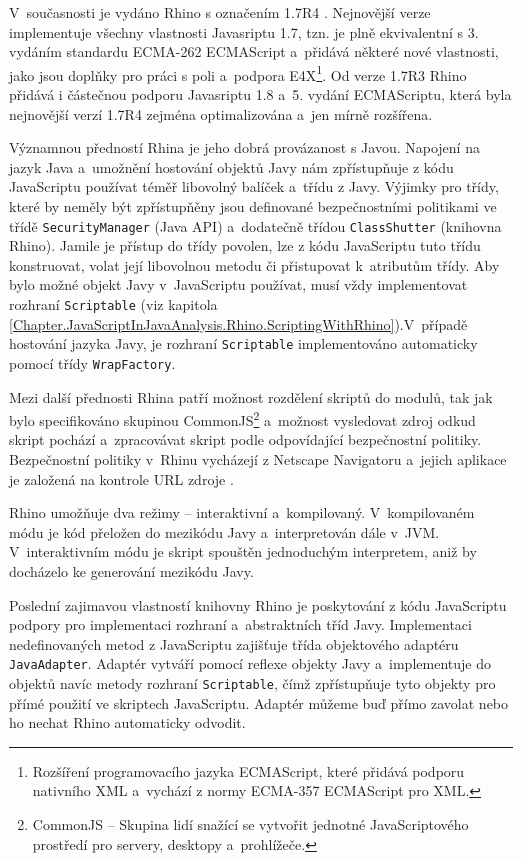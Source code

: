V~současnosti je vydáno Rhino s označením 1.7R4 \cite{Bibliography.Rhino.v17R3,Bibliography.Rhino.v17R4}. Nejnovější verze implementuje všechny vlastnosti Javasriptu 1.7, tzn. je plně ekvivalentní s 3. vydáním standardu \linebreak ECMA-262 ECMAScript a~přidává některé nové vlastnosti, jako jsou doplňky pro práci s poli a~podpora E4X\footnote{Rozšíření programovacího jazyka ECMAScript, které přidává podporu nativního XML a~vychází z normy ECMA-357 ECMAScript pro XML.}. Od verze 1.7R3 Rhino přidává i částečnou podporu Javasriptu 1.8 a~5. vydání ECMAScriptu, která byla nejnovější verzí 1.7R4 zejména optimalizována a~jen mírně rozšířena.

Významnou předností Rhina je jeho dobrá provázanost s Javou. Napojení na jazyk Java a~umožnění hostování objektů Javy nám zpřístupňuje z kódu JavaScriptu používat téměř libovolný balíček a~třídu z Javy. Výjimky pro třídy, které by neměly být zpřístupňěny jsou definované bezpečnostními politikami ve třídě \texttt{SecurityManager} (Java API) a~dodatečně třídou \texttt{ClassShutter} (knihovna Rhino). Jamile je přístup do třídy povolen, lze z kódu JavaScriptu tuto třídu konstruovat, volat její libovolnou metodu či přistupovat k~atributům třídy. Aby bylo možné objekt Javy v~JavaScriptu používat, musí vždy implementovat rozhraní \texttt{Scriptable} (viz kapitola \ref{Chapter.JavaScriptInJavaAnalysis.Rhino.ScriptingWithRhino}).V~případě hostování jazyka Javy, je rozhraní \texttt{Scriptable} implementováno automaticky pomocí třídy \texttt{WrapFactory}. 

Mezi další přednosti Rhina patří možnost rozdělení skriptů do modulů, tak jak bylo specifikováno skupinou CommonJS\footnote{CommonJS -- Skupina lidí snažící se vytvořit jednotné JavaScriptového prostředí pro servery, desktopy a~prohlížeče.} a~možnost vysledovat zdroj odkud skript pochází a~zpracovávat skript podle odpovídající bezpečnostní politiky. Bezpečnostní politiky v~Rhinu vycházejí z Netscape Navigatoru a~jejich aplikace je založená na kontrole URL zdroje \cite{Bibliography.Rhino.Overview}.

Rhino umožňuje dva režimy -- interaktivní a~kompilovaný. V~kompilovaném módu je kód přeložen do mezikódu Javy a~interpretován dále v~JVM. V~interaktivním módu je skript spouštěn jednoduchým interpretem, aniž by docházelo ke generování mezikódu Javy.

Poslední zajimavou vlastností knihovny Rhino je poskytování z kódu JavaScriptu podpory pro implementaci rozhraní a~abstraktních tříd Javy. Implementaci nedefinovaných metod z JavaScriptu zajišťuje třída objektového adaptéru \texttt{JavaAdapter}. Adaptér vytváří pomocí reflexe objekty Javy a~implementuje do objektů navíc metody rozhraní \texttt{Scriptable}, čímž zpřístupňuje tyto objekty pro přímé použití ve skriptech JavaScriptu. Adaptér můžeme buď přímo zavolat nebo ho nechat Rhino automaticky odvodit. 


